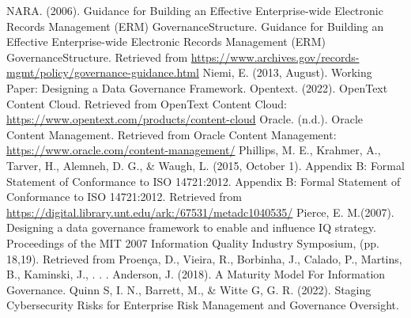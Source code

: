 \documentclass[runningheads]{llncs}
\begin{document}
\begin{thebibliography}{8}
 NARA. (2006). Guidance for Building an Effective Enterprise-wide Electronic Records Management (ERM) GovernanceStructure. Guidance for Building an Effective Enterprise-wide Electronic Records Management (ERM) GovernanceStructure. Retrieved from \url{https://www.archives.gov/records-mgmt/policy/governance-guidance.html}
 Niemi, E. (2013, August). Working Paper: Designing a Data Governance Framework.
 Opentext. (2022). OpenText Content Cloud. Retrieved from OpenText Content Cloud: \url{https://www.opentext.com/products/content-cloud}
 Oracle. (n.d.). Oracle Content Management. Retrieved from Oracle Content Management: \url{https://www.oracle.com/content-management/}
 Phillips, M. E., Krahmer, A., Tarver, H., Alemneh, D. G., \& Waugh, L. (2015, October 1). Appendix B: Formal Statement of Conformance to ISO 14721:2012. Appendix B: Formal Statement of Conformance to ISO 14721:2012. Retrieved from \url{https://digital.library.unt.edu/ark:/67531/metadc1040535/}
 Pierce, E. M.(2007). Designing a data governance framework to enable and influence IQ strategy. Proceedings of the MIT 2007 Information Quality Industry Symposium, (pp. 18,19). Retrieved from
 Proença, D., Vieira, R., Borbinha, J., Calado, P., Martins, B., Kaminski, J., . . . Anderson, J. (2018). A Maturity Model For Information Governance. 
 Quinn S, I. N., Barrett, M., \& Witte G, G. R. (2022). Staging Cybersecurity Risks for Enterprise Risk Management and Governance Oversight.
\end{thebibliography}
\end{document}
